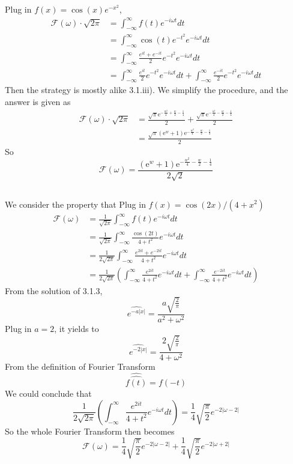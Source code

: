 \documentclass{article}
\begin{document}
\subsection{}
Plug in $f(x) = \cos (x) e^{-x^{2}}$,
\begin{align*}
	\mathcal{F}(\omega)\cdot \sqrt{2\pi} &=\int_{-\infty}^{\infty} f(t) e^{-i \omega t} d t \\ 	
	&=\int_{-\infty}^{\infty} \cos (t) e^{-t^{2}} e^{-i \omega t} d t \\
	&=\int_{-\infty}^{\infty} \frac{e^{it}+e^{-it}}{2} e^{-t^{2}} e^{-i \omega t} d t \\
	&=\int_{-\infty}^{\infty} \frac{e^{it}}{2} e^{-t^{2}} e^{-i \omega t} d t+\int_{-\infty}^{\infty} \frac{e^{-it}}{2} e^{-t^{2}} e^{-i \omega t} d t
\end{align*}
Then the strategy is mostly alike 3.1.iii). We simplify the procedure, and the answer is given as
\begin{align*}
	\mathcal{F}(\omega)\cdot \sqrt{2\pi} &=\frac{\sqrt{\pi} \mathrm{e}^{-\frac{w^{2}}{4}+\frac{w}{2}-\frac{1}{4}}}{2}+\frac{\sqrt{\pi} \mathrm{e}^{-\frac{u^{2}}{4}-\frac{w}{2}-\frac{1}{4}}}{2}\\
	&= \frac{\sqrt{\pi}\left(\mathrm{e}^{w}+1\right) \mathrm{e}^{-\frac{w^{2}}{4}-\frac{w}{2}-\frac{1}{4}}}{2}
\end{align*}
So
\[
	\mathcal{F}(\omega) = \frac{\left(\mathrm{e}^{w}+1\right) \mathrm{e}^{-\frac{w^{2}}{4}-\frac{w}{2}-\frac{1}{4}}}{2\sqrt{2}}
\]
\subsection{}
We consider the property that 
Plug in $f(x) = \cos (2 x) /\left(4+x^{2}\right)$
\begin{align*}
	\mathcal{F}(\omega)&=\frac{1}{\sqrt{2\pi}} \int_{-\infty}^{\infty} f(t) e^{-i \omega t} d t \\ 	
	&= \frac{1}{\sqrt{2\pi}} \int_{-\infty}^{\infty} \frac{\cos(2t)}{4+t^2} e^{-i \omega t} d t \\ 	
	&= \frac{1}{2\sqrt{2\pi}} \int_{-\infty}^{\infty} \frac{{e^{2it}+e^{-2it}}}{4+t^2} e^{-i \omega t} d t \\
	&= \frac{1}{2\sqrt{2\pi}} \left(\int_{-\infty}^{\infty} \frac{e^{2it}}{4+t^2} e^{-i \omega t} d t+\int_{-\infty}^{\infty} \frac{{e^{-2it}}}{4+t^2} e^{-i \omega t} d t\right)
\end{align*}
From the solution of 3.1.3, 
\[
	\widehat{e^{-a|x|}}=\frac{a \sqrt{\frac{2}{\pi}}}{a^{2}+\omega^{2}}
\]
Plug in $a = 2$, it yields to
\[
	\widehat{e^{-2|x|}}=\frac{2 \sqrt{\frac{2}{\pi}}}{4+\omega^{2}}
\]
From the definition of Fourier Transform
\[
	\widehat{\widehat{f(t)}}=f(-t)
\]
We could conclude that
\[
	\frac{1}{2\sqrt{2\pi}} \left(\int_{-\infty}^{\infty} \frac{e^{2it}}{4+t^2} e^{-i \omega t} d t\right) = \frac{1}{4}\sqrt{\frac{\pi}{2}} e^{-2|\omega-2|}
\]
So the whole Fourier Transform then becomes
\[
	\mathcal{F}(\omega) = \frac{1}{4}\sqrt{\frac{\pi}{2}} e^{-2|\omega-2|}+\frac{1}{4}\sqrt{\frac{\pi}{2}} e^{-2|\omega+2|}
\]
\end{document}

